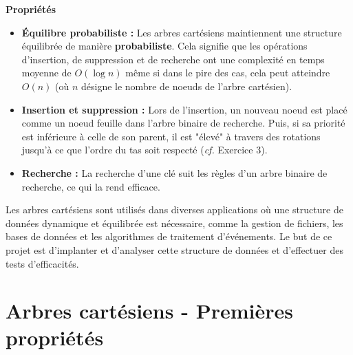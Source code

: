 \documentclass[a4paper,12pt]{report}
\begin{document}
\textbf{Propriétés}
\begin{itemize}
    \item \textbf{Équilibre probabiliste :} Les arbres cartésiens maintiennent une structure équilibrée de manière \textbf{probabiliste}. Cela signifie que les opérations d'insertion, de suppression et de recherche ont une complexité en temps moyenne de \( O(\log n) \) même si dans le pire des cas, cela peut atteindre \( O(n) \) (où \( n \) désigne le nombre de noeuds de l'arbre cartésien).
    \item \textbf{Insertion et suppression :} Lors de l'insertion, un nouveau noeud est placé comme un noeud feuille dans l'arbre binaire de recherche. Puis, si sa priorité est inférieure à celle de son parent, il est "élevé" à travers des rotations jusqu'à ce que l'ordre du tas soit respecté (\textit{cf.} Exercice 3).
    \item \textbf{Recherche :} La recherche d'une clé suit les règles d'un arbre binaire de recherche, ce qui la rend efficace.
\end{itemize}

\newpage

Les arbres cartésiens sont utilisés dans diverses applications où une structure de données dynamique et équilibrée est nécessaire, comme la gestion de fichiers, les bases de données et les algorithmes de traitement d'événements. Le but de ce projet est d'implanter et d'analyser cette structure de données et d'effectuer des tests d'efficacités.






\newpage

\renewcommand{\chaptername}{Exercice}
\chapter{Arbres cartésiens - Premières propriétés}




\end{document}
